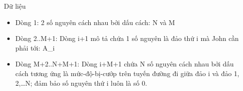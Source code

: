Dữ liệu
\begin{itemize}
	\item     Dòng 1: 2 số nguyên cách nhau bởi dấu cách: N và M   
	\item     Dòng 2..M+1: Dòng i+1 mô tả chứa 1 số nguyên là đảo thứ i         mà John cần phải tới: A\_i   
	\item     Dòng M+2..N+M+1: Dòng i+M+1 chứa N số nguyên cách nhau bởi dấu cách         tương ứng là mức-độ-bị-cướp trên tuyến đường đi giữa đảo i và          đảo 1, 2,…N; đảm bảo số nguyên thứ i luôn là số 0.   
\end{itemize}